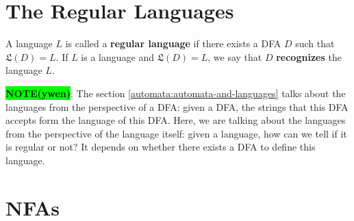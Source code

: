 \documentclass[12pt, letterpaper, oneside]{book}
\begin{document}

\section{The Regular Languages}

A language $L$ is called a \textbf{regular language} if there exists a DFA $D$ such that $\mathfrak{L}(D) = L$.
If $L$ is a language and $\mathfrak{L}(D) = L$, we say that $D$ \textbf{recognizes} the language $L$.

\colorbox{lime}{\textbf{NOTE(ywen)}}: The section \ref{automata:automata-and-languages} talks about the languages from
the perspective of a DFA: given a DFA, the strings that this DFA accepts form the language of this DFA. Here, we are
talking about the languages from the perspective of the language itself: given a language, how can we tell if it is
regular or not? It depends on whether there exists a DFA to define this language.

\section{NFAs}
\end{document}
